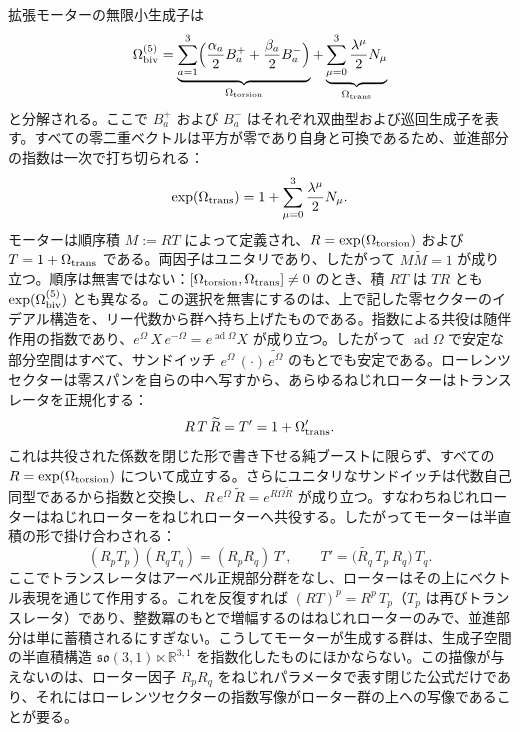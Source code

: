 \documentclass[a4paper]{article}
\theoremstyle{definition}
\theoremstyle{remark}
\begin{document}
拡張モーターの無限小生成子は
\[
\Omega_{\rm biv}^{(5)} = \underbrace{\sum_{a=1}^3 \Bigl( \frac{\alpha_a}{2} B_a^+ + \frac{\beta_a}{2} B_a^- \Bigr)}_{\Omega_{\rm torsion}} + \underbrace{\sum_{\mu=0}^3 \frac{\lambda^\mu}{2} N_\mu}_{\Omega_{\rm trans}}
\]
と分解される。ここで \( B_a^+ \) および \( B_a^- \) はそれぞれ双曲型および巡回生成子を表す。すべての零二重ベクトルは平方が零であり自身と可換であるため、並進部分の指数は一次で打ち切られる：
\[
\exp(\Omega_{\rm trans}) = 1 + \sum_{\mu=0}^3 \frac{\lambda^\mu}{2} N_\mu.
\]
モーターは順序積 \( M := RT \) によって定義され、\( R=\exp(\Omega_{\rm torsion}) \) および \( T=1+\Omega_{\rm trans} \) である。両因子はユニタリであり、したがって \( M\widetilde{M}=1 \) が成り立つ。順序は無害ではない：\([\Omega_{\rm torsion},\Omega_{\rm trans}]\neq 0\) のとき、積 \( RT \) は \( TR \) とも \( \exp(\Omega_{\rm biv}^{(5)}) \) とも異なる。この選択を無害にするのは、上で記した零セクターのイデアル構造を、リー代数から群へ持ち上げたものである。指数による共役は随伴作用の指数であり、\( e^{\Omega}\,X\,e^{-\Omega} = e^{\operatorname{ad}\Omega}X \) が成り立つ。したがって \( \operatorname{ad}\Omega \) で安定な部分空間はすべて、サンドイッチ \( e^{\Omega}\,(\cdot)\,\widetilde{e^{\Omega}} \) のもとでも安定である。ローレンツセクターは零スパンを自らの中へ写すから、あらゆるねじれローターはトランスレータを正規化する：
\[
R\,T\,\widetilde{R} = T' = 1+\Omega'_{\rm trans}.
\]
これは共役された係数を閉じた形で書き下せる純ブーストに限らず、すべての \( R=\exp(\Omega_{\rm torsion}) \) について成立する。さらにユニタリなサンドイッチは代数自己同型であるから指数と交換し、\( R\,e^{\Omega}\,\widetilde R = e^{R\Omega\widetilde R} \) が成り立つ。すなわちねじれローターはねじれローターをねじれローターへ共役する。したがってモーターは半直積の形で掛け合わされる：
\[
(R_pT_p)(R_qT_q) = (R_pR_q)\,T', \qquad T' = \bigl(\widetilde{R_q}\,T_p\,R_q\bigr)\,T_q.
\]
ここでトランスレータはアーベル正規部分群をなし、ローターはその上にベクトル表現を通じて作用する。これを反復すれば \( (RT)^p = R^p\,T_p \)（\( T_p \) は再びトランスレータ）であり、整数冪のもとで増幅するのはねじれローターのみで、並進部分は単に蓄積されるにすぎない。こうしてモーターが生成する群は、生成子空間の半直積構造 \(\mathfrak{so}(3,1)\ltimes\mathbb{R}^{3,1}\) を指数化したものにほかならない。この描像が与えないのは、ローター因子 \( R_pR_q \) をねじれパラメータで表す閉じた公式だけであり、それにはローレンツセクターの指数写像がローター群の上への写像であることが要る。
\end{document}
